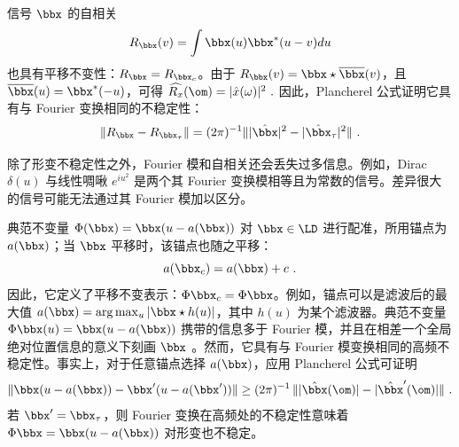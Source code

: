 信号 $\bbx$ 的自相关
$$R_\bbx(v) = \int \bbx(u) \bbx^*(u-v) du$$ 
也具有平移不变性：$R_\bbx = R_{\bbx_c}$。由于 $R_\bbx(v) = \bbx \star \overline{\bbx} (v)$，且 $\overline{\bbx}(u) = \bbx^*(-u)$，可得
$\widehat {R_x} (\om) = |\hat x (\omega)|^2~.$
因此，Plancherel 公式证明它具有与 Fourier 变换相同的不稳定性：
\[
\| R_\bbx - R_{\bbx_\tau} \|= (2 \pi)^{-1} \| |\hat{\bbx}|^2 - |\hat{\bbx}_\tau|^2 \|~.
\]

除了形变不稳定性之外，Fourier 模和自相关还会丢失过多信息。例如，Dirac $\delta (u)$ 与线性啁啾 $e^{i u^2}$ 是两个其 Fourier 变换模相等且为常数的信号。差异很大的信号可能无法通过其 Fourier 模加以区分。

典范不变量 \cite{mnist_deformation,Soatto} $\Phi(\bbx) = \bbx(u -a(\bbx))$ 对 $\bbx \in \LD$ 进行配准，所用锚点为 $a(\bbx)$；当 $\bbx$ 平移时，该锚点也随之平移：
$$a(\bbx_c) = a(\bbx) + c~.$$ 
因此，它定义了平移不变表示：$\Phi \bbx_c = \Phi \bbx$。例如，锚点可以是滤波后的最大值 $a(\bbx) = \arg \max_{u} |\bbx \star h(u)|$，其中 $h(u)$ 为某个滤波器。典范不变量 $\Phi \bbx(u) = \bbx(u - a(\bbx))$ 携带的信息多于 Fourier 模，并且在相差一个全局绝对位置信息的意义下刻画 $\bbx$ \cite{Soatto}。然而，它具有与 Fourier 模变换相同的高频不稳定性。事实上，对于任意锚点选择 $a(\bbx)$，应用 Plancherel 公式可证明
\[
\| \bbx(u-a(\bbx)) - \bbx'(u-a(\bbx')) \|\geq (2 \pi)^{-1}\,\||\hat \bbx(\om)| - |\hat \bbx'(\om)| \| ~.
\]
若 $\bbx' = \bbx_\tau$，则 Fourier 变换在高频处的不稳定性意味着 $\Phi \bbx = \bbx(u-a(\bbx))$ 对形变也不稳定。

